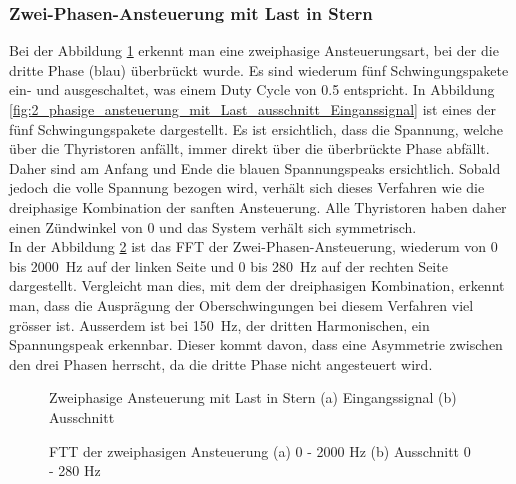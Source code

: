 \subsubsection*{Zwei-Phasen-Ansteuerung mit Last in Stern}\label{sec:2_phasen_Ansteuerung}
Bei der Abbildung \ref{fig:2_phasige_ansteuerung_mit_Last} erkennt man eine zweiphasige Ansteuerungsart, bei der die dritte Phase (blau) überbrückt wurde. Es sind wiederum fünf Schwingungspakete ein- und ausgeschaltet, was einem Duty Cycle von 0.5 entspricht. In Abbildung \ref{fig:2_phasige_ansteuerung_mit_Last_ausschnitt_Einganssignal} ist eines der fünf Schwingungspakete dargestellt. Es ist ersichtlich, dass die Spannung, welche über die Thyristoren anfällt, immer direkt über die überbrückte Phase abfällt. Daher sind am Anfang und Ende die blauen Spannungspeaks ersichtlich. Sobald jedoch die volle Spannung bezogen wird, verhält sich dieses Verfahren wie die dreiphasige Kombination der sanften Ansteuerung. Alle Thyristoren haben daher einen Zündwinkel von 0\textdegree\hspace{0.02cm} und das System verhält sich symmetrisch.\\
In der Abbildung \ref{fig:2_phasige_ansteuerung_mit_Last_FFT} ist das FFT der Zwei-Phasen-Ansteuerung, wiederum von 0 bis \SI{2000}{Hz} auf der linken Seite und 0 bis \SI{280}{Hz} auf der rechten Seite dargestellt. Vergleicht man dies, mit dem der dreiphasigen Kombination, erkennt man, dass die Ausprägung der Oberschwingungen bei diesem Verfahren viel grösser ist. Ausserdem ist bei \SI{150}{Hz}, der dritten Harmonischen, ein Spannungspeak erkennbar. Dieser kommt davon, dass eine Asymmetrie zwischen den drei Phasen herrscht, da die dritte Phase nicht angesteuert wird.

\begin{figure}[ht!]
	\centering
	\qquad
	\caption{Zweiphasige Ansteuerung mit Last in Stern (a) Eingangssignal (b) Ausschnitt}
	\label{fig:2_phasige_ansteuerung_mit_Last}
\end{figure}


\begin{figure}[ht!]
	\centering
	\qquad
	\caption{FTT der zweiphasigen Ansteuerung  (a) 0 - 2000 Hz (b) Ausschnitt 0 - 280 Hz}
	\label{fig:2_phasige_ansteuerung_mit_Last_FFT}
\end{figure}



